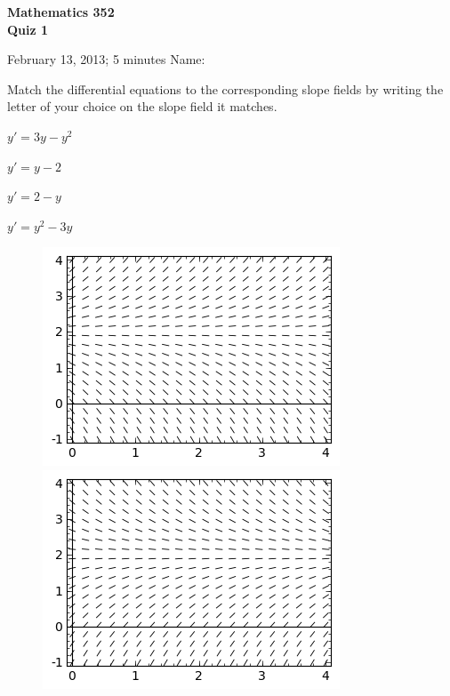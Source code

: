 \documentclass[11pt]{exam}
\begin{document}
\noindent
\textbf{{\large Mathematics 352 \\ Quiz 1}}

\noindent
February 13, 2013; 5 minutes  \hfill Name: \underline{\hspace{3in}} 

\begin{questions}  

\question Match the differential equations to the corresponding slope fields by writing the letter of your choice on the slope field it matches.
    \begin{choices}
        \item $y' = 3y - y^2$
        \item $y' = y - 2$
        \item $y' = 2 - y$
        \item $y' = y^2 - 3y$
    \end{choices}
\begin{figure}[ht]
    \includegraphics[width = 0.45\linewidth]{sage0} \hspace{0.08\linewidth}
    \includegraphics[width = 0.45\linewidth]{sage1}
        

\end{figure}
\end{questions}
\end{document}
